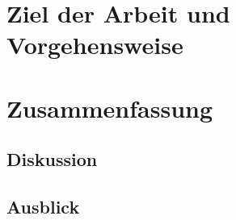 \documentclass[%
english, ngerman,%
]{isw_smb_diss} %
\numberwithin{equation}{chapter} %
\begin{document}
\chapter{Ziel der Arbeit und Vorgehensweise}



\chapter{Zusammenfassung}
\section{Diskussion}
\section{Ausblick}

\nocite{*}

\setlength{\emergencystretch}{.5em}
\printbibliography[heading=bibintoc]




\cleardoublepage
\listoffigures

\cleardoublepage
\listoftables


\end{document}
